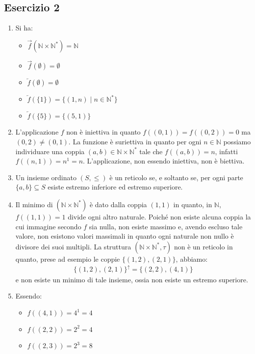 \subsection*{Esercizio 2}
\begin{enumerate}[label=(\textit{\roman*})]
\item Si ha: 
\begin{itemize}
	\item $\overrightarrow{f}(\mathbb{N} \times \mathbb{N}^{*})=\mathbb{N}$
	\item $\overrightarrow{f}(\emptyset) = \emptyset$
	\item $\overleftarrow{f}(\emptyset) = \emptyset$
	\item $\overleftarrow{f}(\{1\})=\{(1,n) \; | \; n \in \mathbb{N}^{*}\}$
	\item $\overleftarrow{f}(\{5\})=\{(5,1)\}$
\end{itemize}
\item L'applicazione $f$ non è iniettiva in quanto $f((0,1))=f((0,2))=0$ ma $(0,2) \neq (0,1)$. La funzione è suriettiva in quanto per ogni $n \in \mathbb{N}$ possiamo individuare una coppia $(a,b) \in \mathbb{N} \times \mathbb{N}^{*}$ tale che $f((a,b))=n$, infatti $f((n,1))=n^{1}=n$. L'applicazione, non essendo iniettiva, non è biettiva.
\item Un insieme ordinato $(S,\leq)$ è un reticolo se, e soltanto se, per ogni parte $\{a,b\} \subseteq S$ esiste estremo inferiore ed estremo superiore.
\item Il minimo di $(\mathbb{N}\times \mathbb{N}^{*})$ è dato dalla coppia $(1,1)$ in quanto, in $\mathbb{N}$, $f((1,1))=1$ divide ogni altro naturale. Poiché non esiste alcuna coppia la cui immagine secondo $f$ sia nulla, non esiste massimo e, avendo escluso tale valore, non esistono valori massimali in quanto ogni naturale non nullo è divisore dei suoi multipli. La struttura $(\mathbb{N}\times \mathbb{N}^{*},\tau)$ non è un reticolo in quanto, prese ad esempio le coppie $\bigl\{(1,2),(2,1)\bigr\}$, abbiamo:
\begin{align*}
	\bigl\{(1,2),(2,1)\bigr\}^{\uparrow} = \{(2,2),(4,1)\}
\end{align*}
e non esiste un minimo di tale insieme, ossia non esiste un estremo superiore.
\item Essendo:
\begin{itemize}
	\item $f((4,1))=4^{1}=4$
	\item $f((2,2))=2^{2}=4$
	\item $f((2,3))=2^{3}=8$

\end{itemize}
\end{enumerate}
